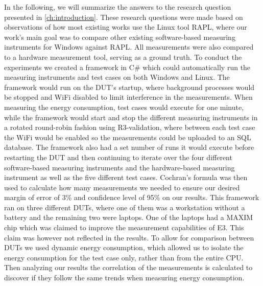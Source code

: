 In the following, we will summarize the answers to the research question presented in \cref{ch:introduction}. These research questions were made based on observations of how most existing works use the Linux tool RAPL, where our work's main goal was to compare other existing software-based measuring instruments for Windows against RAPL. All measurements were also compared to a hardware measurement tool, serving as a ground truth. To conduct the experiments we created a framework in C\# which could automatically run the measuring instruments and test cases on both Windows and Linux. The framework would run on the DUT's startup, where background processes would be stopped and WiFi disabled to limit interference in the measurements. When measuring the energy consumption, test cases would execute for one minute, while the framework would start and stop the different measuring instruments in a rotated round-robin fashion using R3-validation, where between each test case the WiFi would be enabled so the measurements could be uploaded to an SQL database. The framework also had a set number of runs it would execute before restarting the DUT and then continuing to iterate over the four different software-based measuring instruments and the hardware-based measuring instrument as well as the five different test cases. Cochran's formula was then used to calculate how many measurements we needed to ensure our desired margin of error of 3\% and confidence level of 95\% on our results. This framework ran on three different DUTs, where one of them was a workstation without a battery and the remaining two were laptops. One of the laptops had a MAXIM chip which was claimed to improve the measurement capabilities of E3. This claim was however not reflected in the results. To allow for comparison between DUTs we used dynamic energy consumption, which allowed us to isolate the energy consumption for the test case only, rather than from the entire CPU. Then analyzing our results the correlation of the measurements is calculated to discover if they follow the same trends when measuring energy consumption.





